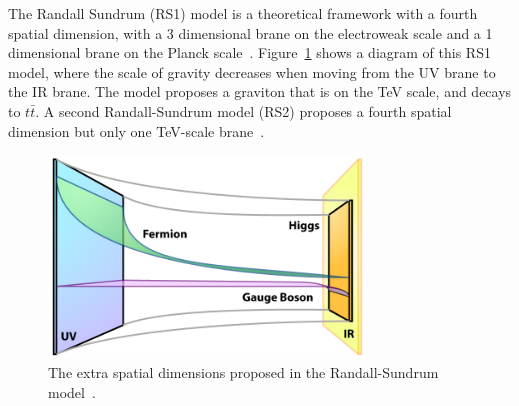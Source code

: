 The Randall Sundrum (RS1) model is a theoretical framework with a fourth spatial dimension, with a 3 dimensional brane on the electroweak scale and a 1 dimensional brane on the Planck scale~\cite{rs1}. Figure~\ref{fig:rsbrane} shows a diagram of this RS1 model, where the scale of gravity decreases when moving from the UV brane to the IR brane. The model proposes a graviton that is on the TeV scale, and decays to $t\bar{t}$. A second Randall-Sundrum model (RS2) proposes a fourth spatial dimension but only one TeV-scale brane~\cite{rs2}.

\begin{figure}[h]
	\centering
	\includegraphics[width=0.75\textwidth]{figures/RSBrane.png}
	\caption{The extra spatial dimensions proposed in the Randall-Sundrum model~\cite{RSBrane}.}
	\label{fig:rsbrane}
\end{figure}



%
%
%
%
%
%
%
%
%
%
%
%
%


